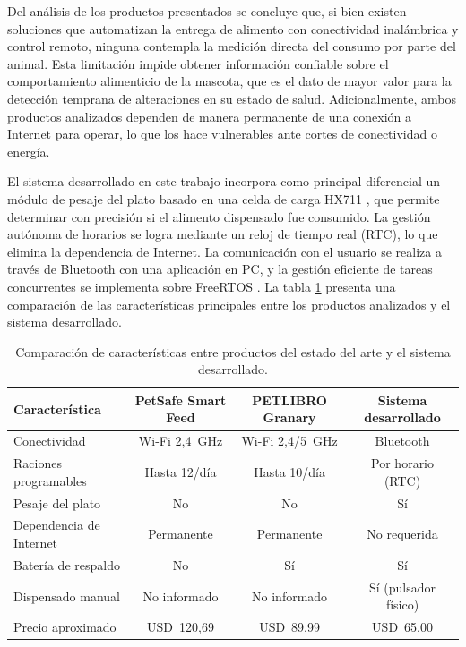 Del análisis de los productos presentados se concluye que, si bien existen soluciones que automatizan la entrega de alimento con conectividad inalámbrica y control remoto, ninguna contempla la medición directa del consumo por parte del animal. Esta limitación impide obtener información confiable sobre el comportamiento alimenticio de la mascota, que es el dato de mayor valor para la detección temprana de alteraciones en su estado de salud. Adicionalmente, ambos productos analizados dependen de manera permanente de una conexión a Internet para operar, lo que los hace vulnerables ante cortes de conectividad o energía.

El sistema desarrollado en este trabajo incorpora como principal diferencial un módulo de pesaje del plato basado en una celda de carga HX711 \cite{hx711_datasheet}, que permite determinar con precisión si el alimento dispensado fue consumido. La gestión autónoma de horarios se logra mediante un reloj de tiempo real (RTC), lo que elimina la dependencia de Internet. La comunicación con el usuario se realiza a través de Bluetooth con una aplicación en PC, y la gestión eficiente de tareas concurrentes se implementa sobre FreeRTOS \cite{freertos_ref}. La tabla \ref{tab:comparacion_estado_arte}  presenta una comparación de las características principales entre los productos analizados y el sistema desarrollado.

\begin{table}[H]
\centering
\caption[Comparación de características entre productos del estado del arte y el sistema desarrollado]{Comparación de características entre productos del estado del arte y el sistema desarrollado.}
\footnotesize 
\begin{tabular}{l c c c}
\toprule
\textbf{Característica} & \textbf{PetSafe Smart Feed} & \textbf{PETLIBRO Granary} & \textbf{Sistema desarrollado} \\
\midrule
Conectividad             & Wi-Fi 2,4~GHz & Wi-Fi 2,4/5~GHz      & Bluetooth            \\
Raciones programables    & Hasta 12/día  & Hasta 10/día         & Por horario (RTC)    \\
Pesaje del plato         & No            & No                   & Sí                   \\
Dependencia de Internet  & Permanente    & Permanente           & No requerida         \\
Batería de respaldo      & No            & Sí                   & Sí                   \\
Dispensado manual        & No informado  & No informado         & Sí (pulsador físico) \\
Precio aproximado        & USD~120,69    & USD~89,99            & USD~65,00            \\
\bottomrule
\end{tabular}
\label{tab:comparacion_estado_arte}
\end{table}

